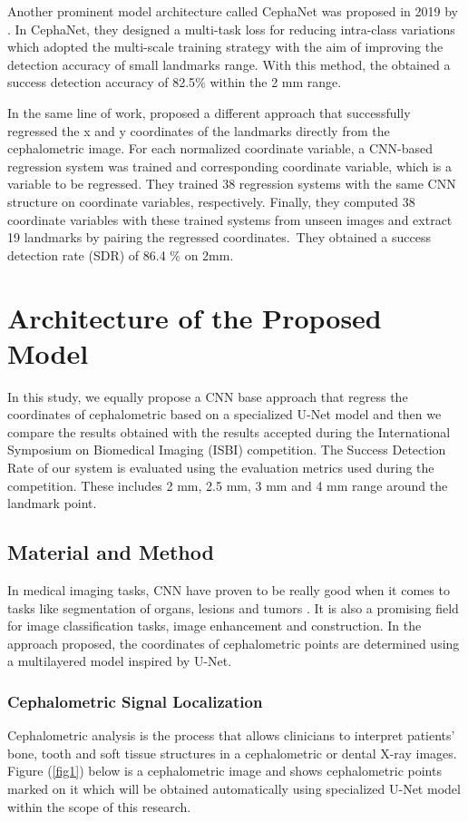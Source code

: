\documentclass{elektr}
\begin{document}
Another prominent model architecture called CephaNet was proposed in 2019 by \cite{ref1}. In CephaNet, they designed a multi-task loss for reducing intra-class variations which adopted the multi-scale training strategy with the aim of improving the detection accuracy of small landmarks range. With this method, the obtained a success detection accuracy of 82.5$\%$  within the 2 mm range.

In the same line of work,\cite{ref6} proposed a different approach that successfully regressed the x and y coordinates of the landmarks directly from the cephalometric image. For each normalized coordinate variable, a CNN-based regression system was trained and corresponding coordinate variable, which is a variable to be regressed. They trained 38 regression systems with the same CNN structure on coordinate variables, respectively. Finally, they computed 38 coordinate variables with these trained systems from unseen images and extract 19 landmarks by pairing the regressed coordinates.\ They obtained a success detection rate (SDR) of 86.4 $\%$  on 2mm.   

\section{Architecture of the Proposed Model}

\tab In this study, we equally propose a CNN base approach that regress the coordinates of cephalometric based on a specialized U-Net model and then we compare the results obtained with the results accepted during the International Symposium on Biomedical Imaging (ISBI) competition. The Success Detection Rate of our system is evaluated using the evaluation metrics used during the competition. These includes 2 mm, 2.5 mm, 3 mm and 4 mm range around the landmark point. 

\subsection{Material and Method}

\tab In medical imaging tasks, CNN have proven to be really good when it comes to tasks like segmentation of organs, lesions and tumors \cite{ref7}. It is also a promising field for image classification tasks, image enhancement and construction. In the approach proposed, the coordinates of cephalometric points are determined using a multilayered model inspired by U-Net. 


\subsubsection{Cephalometric Signal Localization}
\tab Cephalometric analysis is the process that allows clinicians to interpret patients’ bone, tooth and soft tissue structures in a cephalometric or dental X-ray images. Figure (\ref{fig1}) below is a cephalometric image and shows cephalometric points marked on it which will be obtained automatically using specialized U-Net model within the scope of this research.
\end{document}
